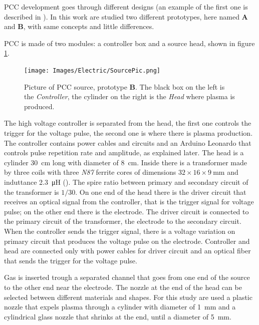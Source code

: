 PCC development goes through different designs (an example of the first one is described in \cite{unipd:ceciliaDBD}). In this work are studied two different prototypes, here named \textbf{A} and \textbf{B}, with same concepts and little differences.

PCC is made of two modules: a controller box and a source head, shown in figure \ref{fig:sourcepic}.
\begin{figure}
 \centering
 \texttt{[image: Images/Electric/SourcePic.png]}
 \caption{Picture of PCC source, prototype \textbf{B}. The black box on the left is the \emph{Controller}, the cylinder on the right is the \emph{Head} where plasma is produced.}
 \label{fig:sourcepic}
\end{figure}

The high voltage controller is separated from the head, the first one controls the trigger for the voltage pulse, the second one is where there is plasma production.
The controller contains power cables and circuits and an Arduino Leonardo that controls pulse repetition rate and amplitude, as explained later.
The head is a cylinder \SI{30}{\centi\meter} long with diameter of \SI{8}{\centi\meter}. Inside there is a transformer made by three coils with three \emph{N87} ferrite cores of dimensions $32 \times 16 \times \SI{9}{\milli\meter}$ and induttance \SI{2.3}{\micro\henry} (\cite{N87datasheet}). The spire ratio between primary and secondary circuit of the transformer is $1/30$.
On one end of the head there is the driver circuit that receives an optical signal from the controller, that is the trigger signal for voltage pulse; on the other end there is the electrode. The driver circuit is connected to the primary circuit of the transformer, the electrode to the secondary circuit. When the controller sends the trigger signal, there is a voltage variation on primary circuit that produces the voltage pulse on the electrode.
Controller and head are connected only with power cables for driver circuit and an optical fiber that sends the trigger for the voltage pulse.

Gas is inserted trough a separated channel that goes from one end of the source to the other end near the electrode.
The nozzle at the end of the head can be selected between different materials and shapes. For this study are used a plastic nozzle that expels plasma through a cylinder with diameter of \SI{1}{\milli\meter} and a cylindrical glass nozzle that shrinks at the end, until a diameter of \SI{5}{\milli\meter}. 

